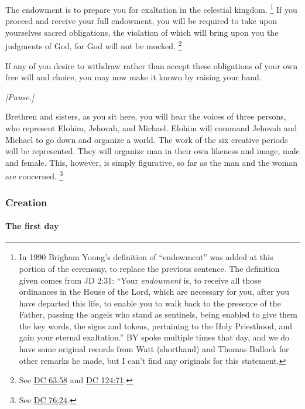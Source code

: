 			The endowment is to prepare you for exaltation in the celestial kingdom.%
				\footnote{%
					\label{ENDOWMENT-definition}%
					In 1990 Brigham Young's definition of ``endowment'' was added at this portion of the ceremony, to replace the previous sentence. The definition given comes from JD 2:31: ``Your \textit{endowment} is, to receive all those ordinances in the House of the Lord, which are necessary for you, after you have departed this life, to enable you to walk back to the presence of the Father, passing the angels who stand as sentinels, being enabled to give them the key words, the signs and tokens, pertaining to the Holy Priesthood, and gain your eternal exaltation.'' BY spoke multiple times that day, and we do have some original records from Watt (shorthand) and Thomas Bullock for other remarks he made, but I can't find any originals for this statement.
					}
			If you proceed and receive your full endowment, you will be required to take upon yourselves sacred obligations, the violation of which will bring upon you the judgments of God, for God will not be mocked.%
				\footnote{%
					See \hyperref[DC63-58]{DC 63:58} and \hyperref[DC124-71]{DC 124:71}.
					}
			
			If any of you desire to withdraw rather than accept these obligations of your own free will and choice, you may now make it known by raising your hand.

			\textit{[Pause.]}

			Brethren and sisters, as you sit here, you will hear the voices of three persons, who represent Elohim, Jehovah, and Michael. Elohim will command Jehovah and Michael to go down and organize a world. The work of the six creative periods will be represented. They will organize man in their own likeness and image, male and female. This, however, is simply figurative, so far as the man and the woman are concerned.%
				\footnote{%
					\label{ENDOWMENT-likeness}%
					See \hyperref[DC76-24]{DC 76:24}.
					}
					
		\subsubsection{Creation}
			\label{TEMPLE-ENDOWMENT-ENDOW-PRE-1990-CREATION}
		
			\paragraph{The first day}
				\label{TEMPLE-ENDOWMENT-ENDOW-PRE-1990-DAY1}
			
